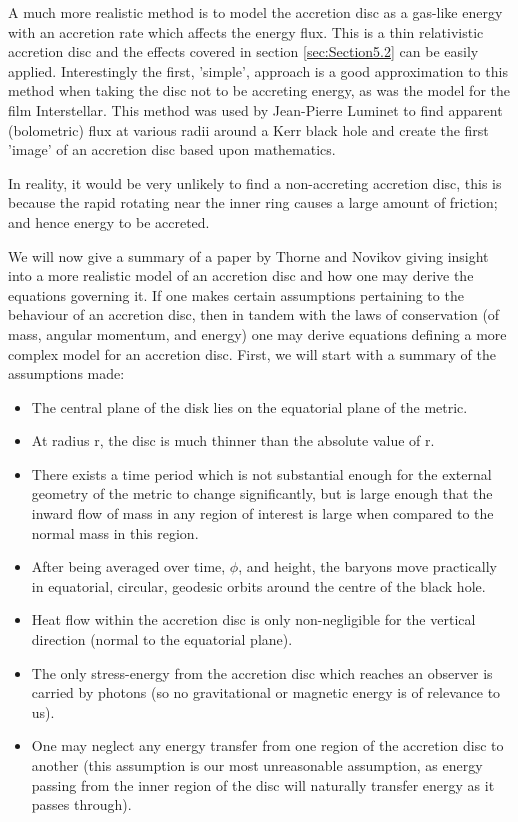\documentclass[oneside,openright,frontopenright, singlespacing]{dmathesis}
\begin{document}
\vspace{1em}
	A much more realistic method is to model the accretion disc as a gas-like energy with an accretion rate which affects the energy flux. This is a thin relativistic accretion disc and the effects covered in section \ref{sec:Section5.2} can be easily applied. Interestingly the first, 'simple', approach is a good approximation to this method when taking the disc not to be accreting energy, as was the model for the film Interstellar. This method was used by Jean-Pierre Luminet to find apparent (bolometric) flux at various radii around a Kerr black hole and create the first 'image' of an accretion disc based upon mathematics.

\vspace{1em}
	In reality, it would be very unlikely to find a non-accreting accretion disc, this is because the rapid rotating near the inner ring causes a large amount of friction; and hence energy to be accreted.

\vspace{1em}
	We will now give a summary of a paper by Thorne and Novikov\cite{novikov1973astrophyics} giving insight into a more realistic model of an accretion disc and how one may derive the equations governing it. If one makes certain assumptions pertaining to the behaviour of an accretion disc, then in tandem with the laws of conservation (of mass, angular momentum, and energy) one may derive equations defining a more complex model for an accretion disc. First, we will start with a summary of the assumptions made:

\vspace{1em}
\begin{itemize}
	\item The central plane of the disk lies on the equatorial plane of the metric.
	\item At radius r, the disc is much thinner than the absolute value of r.
	\item There exists a time period which is not substantial enough for the external geometry of the metric to change significantly, but is large enough that the inward flow of mass in any region of interest is large when compared to the normal mass in this region.
	\item After being averaged over time, $\phi$, and height, the baryons move practically in equatorial, circular, geodesic orbits around the centre of the black hole.
	\item Heat flow within the accretion disc is only non-negligible for the vertical direction (normal to the equatorial plane).
	\item The only stress-energy from the accretion disc which reaches an observer is carried by photons (so no gravitational or magnetic energy is of relevance to us).
	\item One may neglect any energy transfer from one region of the accretion disc to another (this assumption is our most unreasonable assumption, as energy passing from the inner region of the disc will naturally transfer energy as it passes through).
\end{itemize}
\end{document}
